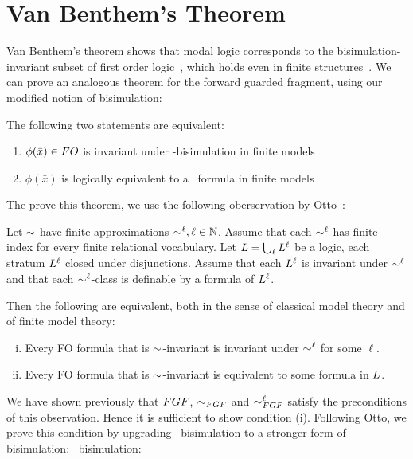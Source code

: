 

\section{Van Benthem's Theorem}\label{sec:van-benthem-theorem}
Van Benthem's theorem shows that modal logic corresponds to the bisimulation-invariant subset of first order logic~\cite{vanBenthem1976, vanBenthem1985}, which holds even in finite structures~\cite{Rosen97}.
We can prove an analogous theorem for the forward guarded fragment, using our modified notion of bisimulation:

\begin{theorem}
  The following two statements are equivalent:
  \begin{enumerate}
    \item $\phi(\bar{x}) \in \Logic{FO}$ is invariant under \FGF-bisimulation in finite models
    \item $\phi(\bar{x})$ is logically equivalent to a \FGF~formula in finite models
  \end{enumerate}
\end{theorem}

The prove this theorem, we use the following oberservation by Otto~\cite{Otto04}:
\begin{observation}
  Let $\sim$ have finite approximations $\sim^{\ell}, \ell \in \mathbb{N}$.
  Assume that each $\sim^{\ell}$ has finite index for every finite relational vocabulary.
  Let $\Logic{L} = \bigcup_{\ell}{\Logic{L}^{\ell}}$ be a logic, each stratum $\Logic{L}^{\ell}$ closed under disjunctions.
  Assume that each $\Logic{L}^{\ell}$ is invariant under $\sim^{\ell}$ and that each $\sim^{\ell}$-class is definable by a formula of $\Logic{L}^{\ell}$.

  Then the following are equivalent, both in the sense of classical model theory and of finite model theory:
  \begin{enumerate}[(i)]
    \item Every FO formula that is $\sim$-invariant is invariant under $\sim^{\ell}$ for some $\ell$.
    \item Every FO formula that is $\sim$-invariant is equivalent to some formula in $\Logic{L}$.
  \end{enumerate}
\end{observation}

We have shown previously that $\FGF$, $\bisimto_{\FGF}$ and $\bisimto_{\FGF}^{\ell}$ satisfy the preconditions of this observation.
Hence it is sufficient to show condition (i).
Following Otto, we prove this condition by upgrading \FGF~bisimulation to a stronger form of bisimulation: \GF~bisimulation:

